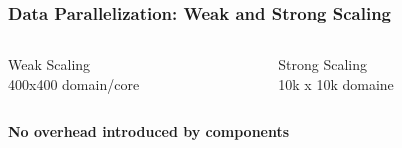 \documentclass{beamer}
\begin{document}
\begin{frame}
\frametitle{Data Parallelization: Weak and Strong Scaling}
\begin{columns}
\begin{column}{6cm}
\begin{center}
\vspace{-1em}
  Weak Scaling\\
  400x400 domain/core
\end{center}
\end{column}
\begin{column}{6cm}
\begin{center}
\vspace{-1em}
  Strong Scaling\\
  10k x 10k domaine
\end{center}
\end{column}
\end{columns}
\bigskip
\begin{center}
  \textbf{No overhead introduced by components}
\end{center}
\end{frame}
\end{document}
